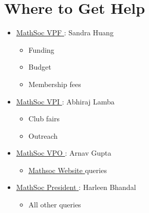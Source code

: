 \documentclass[utf8]{article}
\makeatletter
\newcommand{\MathSocVPFName}{Sandra Huang }
\newcommand{\MathSocVPIName}{Abhiraj Lamba }
\newcommand{\MathSocVPOName}{Arnav Gupta }
\newcommand{\MathSocPrezName}{Harleen Bhandal }
\renewcommand\labelitemii{\textbullet}
\newcommand{\MathSocVPF}{\href{mailto:vpf@mathsoc.uwaterloo.ca}{\underline{MathSoc VPF} }}
\newcommand{\MathSocVPI}{\href{mailto:vpi@mathsoc.uwaterloo.ca}{\underline{MathSoc VPI} }}
\newcommand{\MathSocVPO}{\href{mailto:vpo@mathsoc.uwaterloo.ca}{\underline{MathSoc VPO} }}
\newcommand{\MathSocPrez}{\href{mailto:prez@mathsoc.uwaterloo.ca}{\underline{MathSoc President} }}
\newcommand{\mathsocsite}{\href{https://mathsoc.uwaterloo.ca/}{\underline{Mathsoc Website} }}
\makeatother
\begin{document}
\renewcommand\labelitemii{\textperiodcentered}
\section*{Where to Get Help}
\begin{itemize}
    \item \MathSocVPF : \MathSocVPFName
    \begin{itemize}
        \item Funding
        \item Budget
        \item Membership fees
    \end{itemize}
    \item \MathSocVPI : \MathSocVPIName
    \begin{itemize}
        \item Club fairs
        \item Outreach
    \end{itemize}
    \item \MathSocVPO : \MathSocVPOName
    \begin{itemize}
        \item \mathsocsite queries
    \end{itemize}
    \item \MathSocPrez : \MathSocPrezName
    \begin{itemize}
        \item All other queries
    \end{itemize}
\end{itemize}
\end{document}
